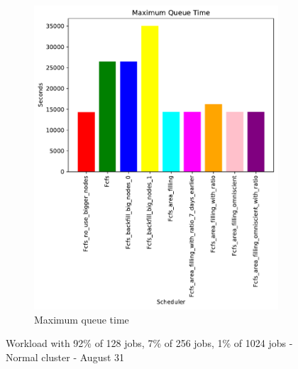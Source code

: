 \documentclass[a4paper]{article}
\begin{document}
\begin{figure}[H]
\begin{subfigure}[b]{0.4\linewidth}\centering\includegraphics[width=0.95\linewidth]{MBSS/plot/Size_Constraint_2022-01-17->2022-01-17_V9271_Maximum_queue_time_450_128_32_256_4_1024.pdf}\caption{Maximum queue time}\label{45}\end{subfigure}
\caption{Workload with 92\% of 128 jobs, 7\% of 256 jobs, 1\% of 1024 jobs - Normal cluster - August 31}\label{49}\end{figure}
\end{document}
